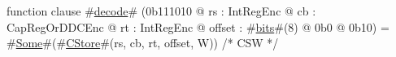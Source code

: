 function clause #\hyperref[sailMIPSzdecode]{decode}# (0b111010 @ rs : IntRegEnc @ cb : CapRegOrDDCEnc @ rt : IntRegEnc @ offset : #\hyperref[sailMIPSzbits]{bits}#(8) @ 0b0 @ 0b10) = #\hyperref[sailMIPSzSome]{Some}#(#\hyperref[sailMIPSzCStore]{CStore}#(rs, cb, rt, offset, W)) /* CSW */
